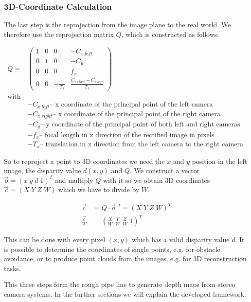 \documentclass[11pt]{article}
\begin{document}
\subsubsection{3D-Coordinate Calculation}
The last step is the reprojection from the image plane to the real world. We therefore use the reprojection matrix $Q$, which is constructed as follows:

\begin{align*}
Q=&
\begin{pmatrix}
1 & 0 & 0 & -C_{x\;left} \\
0 & 1 & 0 & -C_{y} \\
0 & 0 & 0 & f_x \\
0 & 0 & -\frac{1}{T_x} & \frac{C_{x\;right}-C_{x\;left}}{T_x}
\end{pmatrix}\\
\textrm{with}\\
&-C_{x\;left} \textrm{-- x coordinate of the principal point of the left camera }\\
&-C_{x\;right} \textrm{-- x coordinate of the principal point of the right camera }\\
&-C_{y} \textrm{-- y coordinate of the principal point of both left and right cameras  }\\
&-f_x \textrm{-- focal length in x direction of the rectified image in pixels}\\
&-T_x \textrm{-- translation in x direction from the left camera to the right camera }
\end{align*}

So to reproject a point to 3D coordinates we need the $x$ and $y$ position in the left image, the disparity value $d(x,y)$ and $Q$. We construct a vector $\vec{o}=(x\;y\;d\;1)^T$ and multiply $Q$ with it so we obtain 3D coordinates $\vec{c}=(X\;Y\;Z\;W)$ which we have to divide by $W$.

\begin{align*}
	\vec{c}&=Q\cdot \vec{o}\;^T = (X\;Y\;Z\;W)^T\\
	\frac{\vec{c}}{W}&=\left(\frac{X}{W}\;\frac{Y}{W}\;\frac{Z}{W}\;1\right)^T
\end{align*}

This can be done with every pixel $(x,y)$ which has a valid disparity value $d$. It is possible to determine the coordinates of single points, e.g. for obstacle avoidance, or to produce point clouds from the images, e.g. for 3D reconstruction tasks.


\bigskip This three steps form the rough pipe line to generate depth maps from stereo camera systems. In the further sections we will explain the developed framework.
\end{document}
